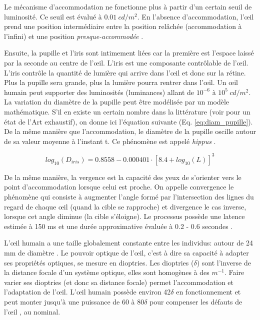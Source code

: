 	\par Le mécanisme d'accommodation ne fonctionne plus à partir d'un certain seuil de luminosité. Ce seuil est évalué à $0.01~cd/m^2$. En l'absence d'accommodation, l'œil prend une position intermédiaire entre la position relâchée (accommodation à l'infini) et une position \textit{presque-accommodée} \citep{gross_human_2008}.
	
	\par Ensuite, la pupille et l'iris sont intimement liées car la première est l'espace laissé par la seconde au centre de l'œil. L'iris est une composante contrôlable de l'œil. L'iris contrôle la quantité de lumière qui arrive dans l'œil et donc sur la rétine. Plus la pupille sera grande, plus la lumière pourra rentrer dans l'œil. Un œil humain peut supporter des luminosités (luminances) allant de $10^{-6}$ à $10^5~cd/m^2$. La variation du diamètre de la pupille peut être modélisée par un modèle mathématique. S'il en existe un certain nombre dans la littérature (voir \citep{watson_unified_2012} pour un état de l'Art exhaustif), on donne ici l'équation suivante (Eq. \ref{eq:diam_pupille}). De la même manière que l'accommodation, le diamètre de la pupille oscille autour de sa valeur moyenne à l'instant t. Ce phénomène est appelé \textit{hippus} \citep{gross_human_2008}.
	
	\begin{equation}
		log_{10}(D_{iris}) = 0.8558 - 0.000401 \cdot [8.4 + log_{10}(L)]^3
		\label{eq:diam_pupille}
	\end{equation}
	
	\par De la même manière, la vergence est la capacité des yeux de s'orienter vers le point d'accommodation lorsque celui est proche. On appelle convergence le phénomène qui consiste à augmenter l'angle formé par l'intersection des lignes du regard de chaque œil (quand la cible se rapproche) et divergence le cas inverse, lorsque cet angle diminue (la cible s'éloigne). Le processus possède une latence estimée à 150 ms et une durée approximative évaluée à 0.2 - 0.6 secondes \citep{devisme_optimisation_2004, gross_human_2008}.
	
	\par L'œil humain a une taille globalement constante entre les individus: autour de 24 mm de diamètre \citep{glassner_principles_1995}. Le pouvoir optique de l'œil, c'est à dire sa capacité à adapter ses propriétés optiques, se mesure en dioptries. Les dioptries ($\delta$) sont l'inverse de la distance focale d'un système optique, elles sont homogènes à des $m^{-1}$. Faire varier ses dioptries (et donc sa distance focale) permet l'accommodation et l'adaptation de l'œil. L'œil humain possède environ 42$\delta$ en fonctionnement et peut monter jusqu'à une puissance de 60 à 80$\delta$ pour compenser les défauts de l'œil \citep{glassner_principles_1995}, au nominal.
	
